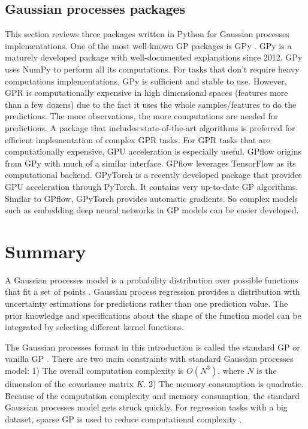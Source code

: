 \documentclass[12pt,letterpaper,fleqn,oneside,titlepage]{offroad-report}
\begin{document}
\subsection{Gaussian processes packages}
This section reviews three packages written in Python for Gaussian processes implementations. One of the most well-known GP packages is GPy \cite{de2017gpflow}. GPy is a maturely developed package with well-documented explanations since 2012. GPy uses NumPy to perform all its computations. For tasks that don't require heavy computations implementations, GPy is sufficient and stable to use. However, GPR is computationally expensive in high dimensional spaces (features more than a few dozens) due to the fact it uses the whole samples/features to do the predictions. The more observations, the more computations are needed for predictions. A package that includes state-of-the-art algorithms is preferred for efficient implementation of complex GPR tasks. For GPR tasks that are computationally expensive, GPU acceleration is especially useful. GPflow \cite{de2017gpflow} origins from GPy with much of a similar interface. GPflow leverages TensorFlow as its computational backend. GPyTorch \cite{gardner2018gpytorch} is a recently developed package that provides GPU acceleration through PyTorch. It contains very up-to-date GP algorithms. Similar to GPflow, GPyTorch provides automatic gradients. So complex models such as embedding deep neural networks in GP models can be easier developed. 

\section{Summary}
A Gaussian processes model is a probability distribution over possible functions that fit a set of points \cite{Rasmussen2006}. Gaussian process regression provides a distribution with uncertainty estimations for predictions rather than one prediction value. The prior knowledge and specifications about the shape of the function model can be integrated by selecting different kernel functions.

The Gaussian processes format in this introduction is called the standard GP or vanilla GP \cite{frigola2013bayesian}. There are two main constraints with standard Gaussian processes model: 1) The overall computation complexity is $O(N^3)$, where $N$ is the dimension of the covariance matrix $K$. 2) The memory consumption is quadratic. Because of the computation complexity and memory consumption, the standard Gaussian processes model gets struck quickly. For regression tasks with a big dataset, sparse GP is used to reduce computational complexity \cite{frigola2013bayesian}.
\end{document}
